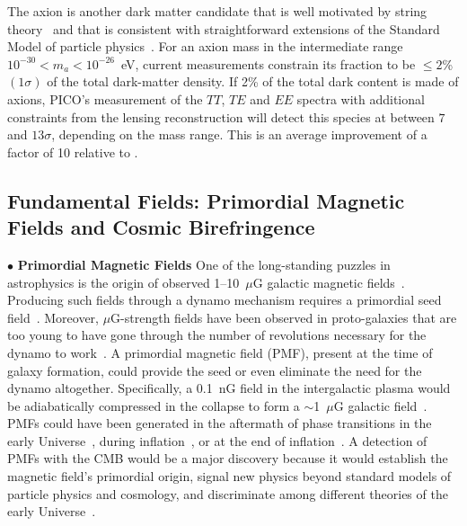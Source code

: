 \documentclass[PICOAPC.tex]{subfiles}
\begin{document}
The axion is another dark matter candidate that is well motivated by string theory~\citep{Arvanitaki_etal} and that is consistent with straightforward extensions of the Standard Model of particle physics~\citep{peccei,weinberg,wilczek}. For an axion mass in the intermediate range $10^{-30} < m_a< 10^{-26} $~eV, current measurements constrain its fraction to be $\le 2$\% $(1\sigma)$ of the total dark-matter density. If 2\% of the total dark content is made of axions, PICO's measurement of the $TT$, $TE$ and $EE$ spectra with additional constraints from the lensing reconstruction will detect this species at between $7$ and $13\sigma$, depending on the mass range. %
This is an average improvement of a factor of 10 relative to \planck .



\subsection{Fundamental Fields: Primordial Magnetic Fields and Cosmic Birefringence}

$\bullet$ {\bf Primordial Magnetic Fields} \hspace{0.1in} One of the long-standing puzzles in astrophysics is the origin of observed 1--10~$\mu$G galactic magnetic fields~\citep{Widrow:2002ud}. Producing such fields through a dynamo mechanism requires a primordial seed field~\citep{Widrow:2011hs}. Moreover, $\mu$G-strength fields have been observed in proto-galaxies that are too young to have gone through the number of revolutions necessary for the dynamo to work~\citep{Athreya:1998}. A primordial magnetic field (PMF), present at the time of galaxy formation, could provide the seed or even eliminate the need for the dynamo altogether. Specifically, a 0.1~nG field in the intergalactic plasma would be adiabatically compressed in the collapse to form a $\sim$1~$\mu$G galactic field~\citep{Grasso:2000wj}.
PMFs could have been generated in the aftermath of phase transitions in the early Universe~\citep{Vachaspati:1991nm}, during inflation~\cite{Turner:1987bw,Ratra:1991bn}, or at the end of inflation~\cite{DiazGil:2007dy}. A detection of PMFs with the CMB would be a major discovery because it would establish the magnetic field's primordial origin, signal new physics beyond standard models of particle physics and cosmology, and discriminate among different theories of the early Universe~\cite{Barnaby:2012tk,Long:2013tha,Durrer:2013pga}.
\end{document}
